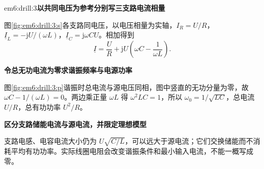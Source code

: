 \begin{drillsolution}{em6:drill:3}\textbf{以共同电压为参考分别写三支路电流相量}\par\nobreak
图\ref{fig:em6:drill:3:s}各支路同电压，以电压相量为实轴，$I_R=U/R$，$\underline I_L=-\mathrm jU/(\omega L)$，$\underline I_C=\mathrm j\omega CU$。相加得到
\[\underline I=\frac UR+\mathrm jU\left(\omega C-\frac1{\omega L}\right).\]



\par\medskip{}\noindent\textbf{令总无功电流为零求谐振频率与电源功率}\par\nobreak
图\ref{fig:em6:drill:3:p}谐振时总电流与源电压同相，图中竖直的无功分量为零，故 $\omega C-1/(\omega L)=0$。两边乘正量 $\omega L$ 得 $\omega^2LC=1$，所以 $\omega_0=1/\sqrt{LC}$，总电流 $U/R$，总有功功率 $U^2/R$。

\par\medskip{}\noindent\textbf{区分支路储能电流与源电流，并限定理想模型}\par\nobreak
支路电感、电容电流大小仍为 $U\sqrt{C/L}$，可以远大于源电流；它们交换储能而不消耗平均有功功率。实际线圈电阻会改变谐振条件和最小输入电流，不能一概写成零。\end{drillsolution}
